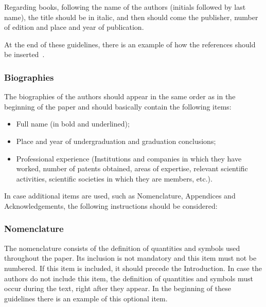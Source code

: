 \documentclass[english]{sobraep}
\begin{document}
Regarding books, following the name of the authors (initials followed by last name), the title should be in italic, and then should come the publisher, number of edition and place and year of publication.

At the end of these guidelines, there is an example of how the references should be inserted~\cite{refbib1,refbib2,refbib3,refbib4,refbib5,refbib6,refbib7,refbib8}.




\subsubsection{Biographies}

The biographies of the authors should appear in the same order as in the beginning of the paper and should basically contain the following items:
\begin{itemize}
	\item Full name (in bold and underlined);
	\item Place and year of undergraduation and graduation conclusions;
	\item Professional experience (Institutions and companies in which they have worked, number of patents obtained, areas of expertise, relevant scientific activities, scientific societies in which they are members, etc.). \newline
\end{itemize}

In case additional items are used, such as Nomenclature, Appendices and Acknowledgements, the following instructions should be considered:

\subsubsection{Nomenclature}

The nomenclature consists of the definition of quantities and symbols used throughout the paper. Its inclusion is not mandatory and this item must not be numbered. If this item is included, it should precede the Introduction. In case the authors do not include this item, the  definition of quantities and symbols must occur during the text, right after they appear. In the beginning of these guidelines there is an example of this optional item.
\end{document}
